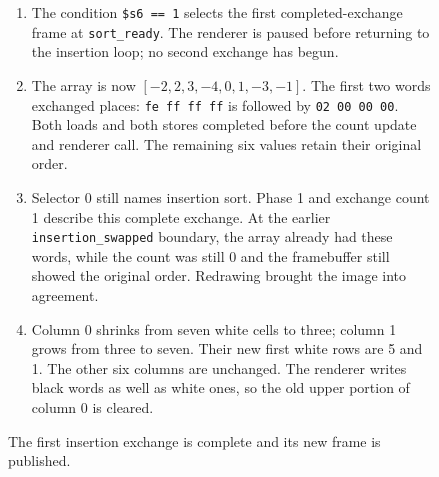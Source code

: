 \begin{figure}[htbp]
  \par\smallskip
  \begin{minipage}{\linewidth}
    \small
    \begin{enumerate}
      \item The condition \texttt{\$s6 == 1} selects the first completed-exchange frame at \texttt{sort\_ready}. The renderer is paused before returning to the insertion loop; no second exchange has begun.
      \item The array is now $[-2,2,3,-4,0,1,-3,-1]$. The first two words exchanged places: \texttt{fe ff ff ff} is followed by \texttt{02 00 00 00}. Both loads and both stores completed before the count update and renderer call. The remaining six values retain their original order.
      \item Selector 0 still names insertion sort. Phase 1 and exchange count 1 describe this complete exchange. At the earlier \texttt{insertion\_swapped} boundary, the array already had these words, while the count was still 0 and the framebuffer still showed the original order. Redrawing brought the image into agreement.
      \item Column 0 shrinks from seven white cells to three; column 1 grows from three to seven. Their new first white rows are 5 and 1. The other six columns are unchanged. The renderer writes black words as well as white ones, so the old upper portion of column 0 is cleared.
    \end{enumerate}
  \end{minipage}
  \caption{The first insertion exchange is complete and its new frame is published.}
  \label{capture:009-sorting-visualizer-f02-insertion}
\end{figure}
\par
